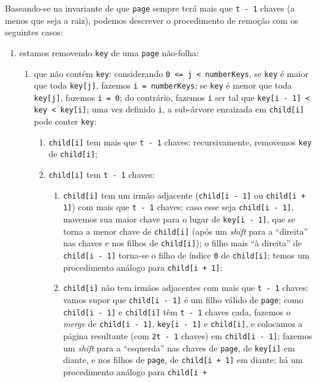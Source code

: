 \documentclass[11pt]{article}
\begin{document}
Baseando-se na invariante de que \texttt{page} sempre terá mais que \texttt{t -
    1} chaves (a menos que seja a raiz), podemos descrever o
procedimento de remoção com os seguintes casos:
\begin{enumerate}
\item estamos removendo \texttt{key} de uma \texttt{page} não-folha:
\begin{enumerate}
\item que não contém \texttt{key}: considerando \texttt{0 <= j < numberKeys}, se
\texttt{key} é maior que toda \texttt{key[j]}, fazemos \texttt{i = numberKeys};
se \texttt{key} é menor que toda \texttt{key[j]}, fazemos \texttt{i = 0}; do
contrário, fazemos \texttt{i} ser tal que \texttt{key[i - 1] < key <
          key[i]}; uma vez definido \texttt{i}, a sub-árvore enraizada em
\texttt{child[i]} pode conter \texttt{key}:
\begin{enumerate}
\item \texttt{child[i]} tem mais que \texttt{t - 1} chaves: recursivamente,
removemos \texttt{key} de \texttt{child[i]};
\item \texttt{child[i]} tem \texttt{t - 1} chaves:
\begin{enumerate}
\item \label{org4e81f98} \texttt{child[i]} tem um
irmão adjacente (\texttt{child[i - 1]} ou \texttt{child[i + 1]}) com
mais que \texttt{t - 1} chaves: caso esse seja \texttt{child[i -
                1]}, movemos sua maior chave para o lugar de \texttt{key[i -
                1]}, que se torna a menor chave de \texttt{child[i]} (após um
\emph{shift} para a ``direita'' nas chaves e nos filhos de
\texttt{child[i]}); o filho mais ``à direita'' de \texttt{child[i -
                1]} torna-se o filho de índice \texttt{0} de \texttt{child[i]};
temos um procedimento análogo para \texttt{child[i + 1]};
\item \label{orgdfb958d} \texttt{child[i]} não tem irmãos
adjacentes com mais que \texttt{t - 1} chaves: vamos supor
que \texttt{child[i - 1]} é um filho válido de \texttt{page}; como
\texttt{child[i - 1]} e \texttt{child[i]} têm \texttt{t - 1} chaves cada,
fazemos o \emph{merge} de \texttt{child[i - 1]}, \texttt{key[i - 1]} e
\texttt{child[i]}, e colocamos a página resultante (com \texttt{2t -
                1} chaves) em \texttt{child[i - 1]}; fazemos um \emph{shift} para
a ``esquerda'' nas chaves de \texttt{page}, de \texttt{key[i]} em
diante, e nos filhos de \texttt{page}, de \texttt{child[i + 1]} em
diante; há um procedimento análogo para \texttt{child[i +
}
\end{enumerate}
\end{enumerate}
\end{enumerate}
\end{enumerate}
\end{document}
